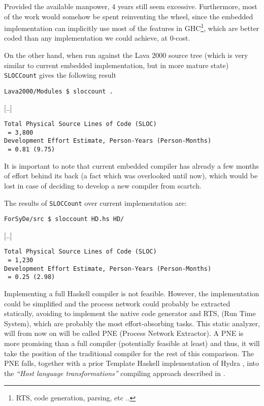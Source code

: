 \documentclass[a4paper,twoside,11pt]{article}
\begin{document}
Provided the available manpower, 4 years still seem excessive. Furthermore,
most of the work would somehow be spent reinventing the wheel, since the
embedded implementation can implicitly use most of the features in
GHC\footnote{RTS, code generation, parsing, etc ..}, which are better
coded than any implementation we could achieve, at 0-cost.


On the other hand, when run against the Lava 2000 source tree (which is very
similar to current embedded implementation, but in more mature state)
\texttt{SLOCCount} gives the following result

\begin{verbatim} 
Lava2000/Modules $ sloccount .
\end{verbatim}
[..]
\begin{verbatim}
Total Physical Source Lines of Code (SLOC)                
 = 3,800
Development Effort Estimate, Person-Years (Person-Months) 
 = 0.81 (9.75)
\end{verbatim}


It is important to note that current embedded compiler has already a few
months of effort behind its back (a fact which was overlooked until now), which
would be lost in case of deciding to develop a new compiler from scartch.

The results of \texttt{SLOCCount} over current implementation are:

\begin{verbatim} 
ForSyDe/src $ sloccount HD.hs HD/
\end{verbatim}
[..]
\begin{verbatim}
Total Physical Source Lines of Code (SLOC)                
 = 1,230
Development Effort Estimate, Person-Years (Person-Months) 
 = 0.25 (2.98)
\end{verbatim}



Implementing a full Haskell compiler is not feasible. However, the
implementation could be simplified and the process network could probably be
extracted statically, avoiding to implement the native code generator and RTS,
(Run Time System), which are probably the most effort-absorbing tasks. This
static analyzer, will from now on will be called PNE (Process Network
Extractor). A PNE is more promising than a full compiler (potentially feasible
at least) and thus, it will take the position of the traditional compiler for
the rest of this comparison. The PNE falls, together with a prior Template
Haskell implementation of Hydra \cite{hydra:th}, into the \textit{``Host
  language transformations''} compiling approach described in \cite[section
2.4.1.4]{forsyde:synthesis}.
\end{document}
